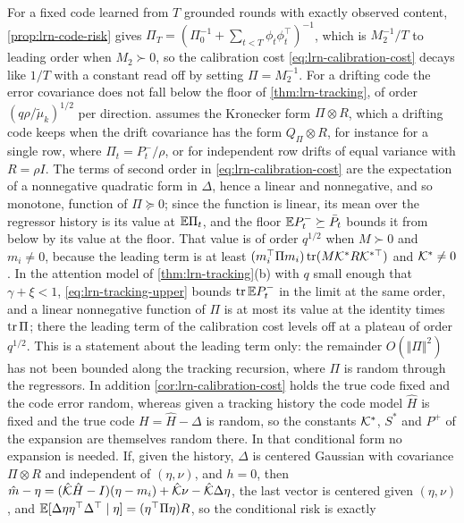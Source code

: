 \begin{remark}\label{rem:lrn-learning-curve}
For a fixed code learned from $T$ grounded rounds with exactly observed content, \cref{prop:lrn-code-risk} gives $\Pi_T=(\Pi_0^{-1}+\sum_{t<T}\phi_t\phi_t^\top)^{-1}$, which is $M_2^{-1}/T$ to leading order when $M_2\succ0$, so the calibration cost \cref{eq:lrn-calibration-cost} decays like $1/T$ with a constant read off by setting $\Pi=M_2^{-1}$. For a drifting code the error covariance does not fall below the floor of \cref{thm:lrn-tracking}, of order $(q\rho/\tilde\mu_k)^{1/2}$ per direction.  assumes the Kronecker form $\Pi\otimes R$, which a drifting code keeps when the drift covariance has the form $Q_\Pi\otimes R$, for instance for a single row, where $\Pi_t=P^-_t/\rho$, or for independent row drifts of equal variance with $R=\rho I$. The terms of second order in \cref{eq:lrn-calibration-cost} are the expectation of a nonnegative quadratic form in $\Delta$, hence a linear and nonnegative, and so monotone, function of $\Pi\succeq0$; since the function is linear, its mean over the regressor history is its value at $\mathbb{E}\Pi_t$, and the floor $\mathbb{E} P^-_t\succeq\bar P_t$ bounds it from below by its value at the floor. That value is of order $q^{1/2}$ when $M\succ0$ and $m_i\ne0$, because the leading term is at least $(m_i^\top\Pi m_i)\operatorname{tr}(M\mathcal{K}^\ast R\mathcal{K}^{\ast\top})$ and $\mathcal{K}^\ast\ne0$. In the attention model of \cref{thm:lrn-tracking}(b) with $q$ small enough that $\gamma+\xi<1$, \cref{eq:lrn-tracking-upper} bounds $\operatorname{tr}\mathbb{E} P^-_t$ in the limit at the same order, and a linear nonnegative function of $\Pi$ is at most its value at the identity times $\operatorname{tr}\Pi$; there the leading term of the calibration cost levels off at a plateau of order $q^{1/2}$. This is a statement about the leading term only: the remainder $O(\Vert\Pi\Vert^2)$ has not been bounded along the tracking recursion, where $\Pi$ is random through the regressors. In addition \cref{cor:lrn-calibration-cost} holds the true code fixed and the code error random, whereas given a tracking history the code model $\hat H$ is fixed and the true code $H=\hat H-\Delta$ is random, so the constants $\mathcal{K}^\ast$, $S^\ast$ and $P^+$ of the expansion are themselves random there. In that conditional form no expansion is needed. If, given the history, $\Delta$ is centered Gaussian with covariance $\Pi\otimes R$ and independent of $(\eta,\nu)$, and $h=0$, then $\hat m-\eta=(\hat{\mathcal{K}}\hat H-I)(\eta-m_i)+\hat{\mathcal{K}}\nu-\hat{\mathcal{K}}\Delta\eta$, the last vector is centered given $(\eta,\nu)$, and $\mathbb{E}[\Delta\eta\eta^\top\Delta^\top\mid\eta]=(\eta^\top\Pi\eta)R$, so the conditional risk is exactly

\end{remark}

